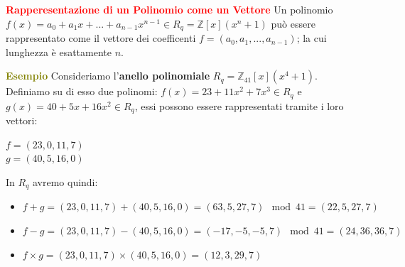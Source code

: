 \begin{flushleft}
    \textcolor{red}{\textbf{Rapperesentazione di un Polinomio come un Vettore}} \newline
    Un polinomio $f(x) = a_0 + a_1 x + ... + a_{n-1}x^{n-1} \in R_q = \mathbb{Z}[x](x^n+1)$ può essere rappresentato come il vettore dei coefficenti $f = (a_0, a_1, ..., a_{n-1})$; la cui lunghezza è esattamente $n$.

    \begin{boxA}
        \textcolor{olive}{\textbf{Esempio}} \newline
        Consideriamo l'\textbf{anello polinomiale} $R_q = \mathbb{Z}_{41}[x](x^4+1)$. Definiamo su di esso due polinomi: $f(x) = 23 + 11x^2 + 7x^3 \in R_q$ e $g(x) = 40 + 5x + 16x^2 \in R_q$, essi possono essere rappresentati tramite i loro vettori:

        {\centering
            $f = (23, 0, 11, 7)$ \\
            $g = (40, 5, 16, 0)$
        \par}

        In $R_q$ avremo quindi:
        \begin{itemize}[nosep]
            \item $f+g = (23, 0, 11, 7) + (40, 5, 16, 0) = (63, 5, 27, 7) \mod 41 = (22, 5, 27, 7)$
            \item $f-g = (23, 0, 11, 7) - (40, 5, 16, 0) = (-17, -5, -5, 7) \mod 41 = (24, 36, 36, 7)$
            \item $f \times g = (23, 0, 11, 7) \times (40, 5, 16, 0) = (12, 3, 29, 7)$
        \end{itemize}
    \end{boxA}
\end{flushleft}

